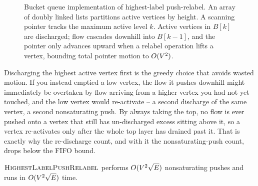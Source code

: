 \begin{figure}[H]
\caption{Bucket queue implementation of highest-label push-relabel. An array of doubly linked lists partitions active vertices by height. A scanning pointer tracks the maximum active level $k$. Active vertices in $B[k]$ are discharged; flow cascades downhill into $B[k-1]$, and the pointer only advances upward when a relabel operation lifts a vertex, bounding total pointer motion to $O(V^2)$.}
\label{ch13:fig-highest-buckets}
\end{figure}

\begin{intuitionbox}
Discharging the highest active vertex first is the greedy choice that avoids wasted motion. If you instead emptied a low vertex, the flow it pushes downhill might immediately be overtaken by flow arriving from a higher vertex you had not yet touched, and the low vertex would re-activate -- a second discharge of the same vertex, a second nonsaturating push. By always taking the top, no flow is ever pushed onto a vertex that still has un-discharged excess sitting above it, so a vertex re-activates only after the whole top layer has drained past it. That is exactly why the re-discharge count, and with it the nonsaturating-push count, drops below the FIFO bound.
\end{intuitionbox}

\begin{theorem}
\label{ch13:thm-highest}
$\textsc{HighestLabelPushRelabel}$ performs $O(V^2\sqrt{E})$ nonsaturating pushes and runs in $O(V^2\sqrt{E})$ time.
\end{theorem}

